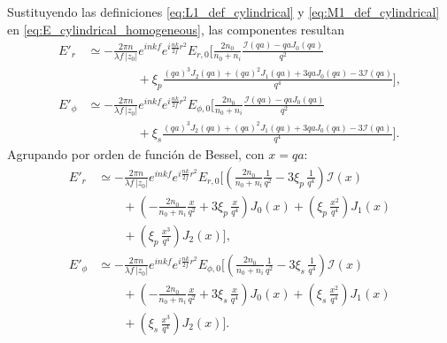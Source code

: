 Sustituyendo las definiciones \eqref{eq:L1_def_cylindrical} y \eqref{eq:M1_def_cylindrical} en \eqref{eq:E_cylindrical_homogeneous}, las componentes resultan
\begin{equation}
\begin{aligned}
E'_r
&\simeq
-\frac{2\pi n}{\lambda f\,|z_0|}
e^{inkf}
e^{i\frac{nk}{2f}r^2}
E_{r,0}
\Bigg[
\frac{2n_0}{n_0+n_i}
\frac{\mathcal I(qa)-qaJ_0(qa)}{q^2}
\\
&\qquad\qquad
+
\xi_p
\frac{
(qa)^3J_2(qa)
+
(qa)^2J_1(qa)
+
3qaJ_0(qa)
-
3\mathcal I(qa)
}{q^4}
\Bigg],
\\[0.4em]
E'_\phi
&\simeq
-\frac{2\pi n}{\lambda f\,|z_0|}
e^{inkf}
e^{i\frac{nk}{2f}r^2}
E_{\phi,0}
\Bigg[
\frac{2n_0}{n_0+n_i}
\frac{\mathcal I(qa)-qaJ_0(qa)}{q^2}
\\
&\qquad\qquad
+
\xi_s
\frac{
(qa)^3J_2(qa)
+
(qa)^2J_1(qa)
+
3qaJ_0(qa)
-
3\mathcal I(qa)
}{q^4}
\Bigg].
\end{aligned}
\label{eq:E_cylindrical_homogeneous_explicit}
\end{equation}
Agrupando por orden de función de Bessel, con $x = qa$:
\begin{equation}
\begin{aligned}
E'_r
&\simeq
-\frac{2\pi n}{\lambda f\,|z_0|}
e^{inkf}
e^{i\frac{nk}{2f}r^2}
E_{r,0}
\Bigg[
\left(
\frac{2n_0}{n_0+n_i}\frac{1}{q^2}
-
3\xi_p\,\frac{1}{q^4}
\right)\mathcal I(x)
\\
&\qquad
+
\left(
-\frac{2n_0}{n_0+n_i}\frac{x}{q^2}
+
3\xi_p\,\frac{x}{q^4}
\right)J_0(x)
+
\left(
\xi_p\,\frac{x^2}{q^4}
\right)J_1(x)
\\
&\qquad
+
\left(
\xi_p\,\frac{x^3}{q^4}
\right)J_2(x)
\Bigg],
\\[0.6em]
E'_\phi
&\simeq
-\frac{2\pi n}{\lambda f\,|z_0|}
e^{inkf}
e^{i\frac{nk}{2f}r^2}
E_{\phi,0}
\Bigg[
\left(
\frac{2n_0}{n_0+n_i}\frac{1}{q^2}
-
3\xi_s\,\frac{1}{q^4}
\right)\mathcal I(x)
\\
&\qquad
+
\left(
-\frac{2n_0}{n_0+n_i}\frac{x}{q^2}
+
3\xi_s\,\frac{x}{q^4}
\right)J_0(x)
+
\left(
\xi_s\,\frac{x^2}{q^4}
\right)J_1(x)
\\
&\qquad
+
\left(
\xi_s\,\frac{x^3}{q^4}
\right)J_2(x)
\Bigg].
\end{aligned}
\label{eq:E_cylindrical_homogeneous_grouped_bessel}
\end{equation}

